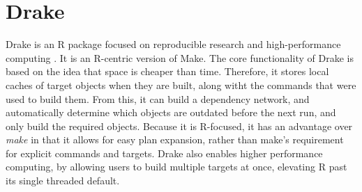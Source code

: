 \section{Drake}

Drake is an R package focused on reproducible research and
high-performance computing \Cite{hid-sp18-403-R-drake}. It is an
R-centric version of Make. The core functionality of Drake is based on
the idea that space is cheaper than time.  Therefore, it stores local
caches of target objects when they are built, along witht the commands
that were used to build them. From this, it can build a dependency
network, and automatically determine which objects are outdated before
the next run, and only build the required objects. Because it is
R-focused, it has an advantage over \textit{make} in that it allows
for easy plan expansion, rather than make’s requirement for explicit
commands and targets.  Drake also enables higher performance
computing, by allowing users to build multiple targets at once,
elevating R past its single threaded default.
